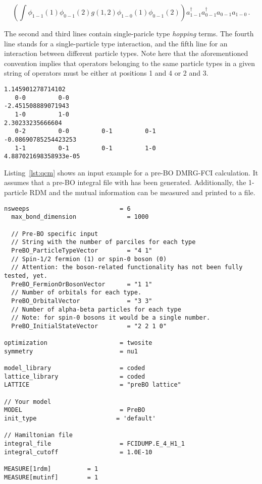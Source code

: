 \documentclass[bibliography=totoc,12pt,a4paper]{scrartcl}
\begin{document}
\begin{equation}
  \left(\int \phi_{1-1}(1)\phi_{0-1}(2)g(1,2)\phi_{1-0}(1)\phi_{0-1}(2)\right)
  a^\dagger_{1-1} a^\dagger_{0-1} a_{0-1} a_{1-0}\,.
\end{equation}

The second and third lines contain single-paricle type \textit{hopping} terms.
The fourth line stands for a single-particle type interaction, and the fifth
line for an interaction between different particle types. 
Note here that the aforementioned convention implies that operators belonging to
the same particle types in a given string of operators must be either at
positions 1 and 4 or 2 and 3. 

\begin{lstlisting}[language=qcmaquis,caption={Pre-BO integral file
format.},label=lst:prebodump]
1.145901278714102                       
   0-0         0-0                                      -2.451508889071943
   1-0         1-0                                      2.30233235666604
   0-2         0-0         0-1         0-1              -0.08690785254423253
   1-1         0-1         0-1         1-0              4.887021698358933e-05
\end{lstlisting}

Listing~\ref{lst:qcm} shows an input example for a pre-BO DMRG-FCI calculation. 
It assumes that a pre-BO integral file with has been generated. Additionally,
the 1-particle RDM and the mutual information can be measured and printed to a
file.

\begin{lstlisting}[language=qcmaquis,
				   caption={Input example for a pre-BO DMRG-FCI calculation},
				   label=lst:preboinput]
  nsweeps                         = 6
  max_bond_dimension              = 1000

  // Pre-BO specific input
  // String with the number of parciles for each type
  PreBO_ParticleTypeVector        = "4 1"
  // Spin-1/2 fermion (1) or spin-0 boson (0)
  // Attention: the boson-related functionality has not been fully tested, yet.
  PreBO_FermionOrBosonVector      = "1 1"
  // Number of orbitals for each type.
  PreBO_OrbitalVector             = "3 3"
  // Number of alpha-beta particles for each type
  // Note: for spin-0 bosons it would be a single number.
  PreBO_InitialStateVector        = "2 2 1 0"

optimization                    = twosite 
symmetry                        = nu1

model_library                   = coded
lattice_library                 = coded
LATTICE                         = "preBO lattice" 

// Your model
MODEL                           = PreBO
init_type                      = 'default'

// Hamiltonian file
integral_file                   = FCIDUMP.E_4_H1_1
integral_cutoff                 = 1.0E-10

MEASURE[1rdm]          = 1
MEASURE[mutinf]        = 1
\end{lstlisting}
\end{document}
